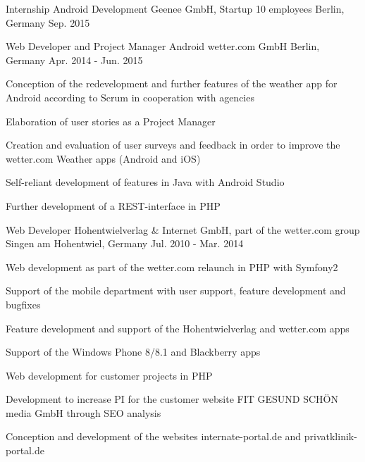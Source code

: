 \begin{cventries}
  \cventry
    {Internship Android Development} %
    {Geenee GmbH, Startup 10 employees} %
    {Berlin, Germany} %
    {Sep. 2015} %

  \cventry
    {Web Developer and Project Manager Android} %
    {wetter.com GmbH} %
    {Berlin, Germany} %
    {Apr. 2014 - Jun. 2015} %
    {
      \begin{cvitems} %
        \item {Conception of the redevelopment and further features of the weather app for Android according to Scrum in cooperation with agencies}
        \item {Elaboration of user stories as a Project Manager}
        \item {Creation and evaluation of user surveys and feedback in order to improve the wetter.com Weather apps (Android and iOS)}
        \item {Self-reliant development of features in Java with Android Studio}
        \item {Further development of a REST-interface in PHP}
      \end{cvitems}
    }

  \cventry
    {Web Developer} %
    {Hohentwielverlag \& Internet GmbH, part of the wetter.com group} %
    {Singen am Hohentwiel, Germany} %
    {Jul. 2010 - Mar. 2014} %
    {
      \begin{cvitems} %
        \item {Web development as part of the wetter.com relaunch in PHP with Symfony2}
        \item {Support of the mobile department with user support, feature development and bugfixes}
        \item {Feature development and support of the Hohentwielverlag and wetter.com apps}
        \item {Support of the Windows Phone 8/8.1 and Blackberry apps}
        \item {Web development for customer projects in PHP}
        \item {Development to increase PI for the customer website FIT GESUND SCHÖN media GmbH through SEO analysis}
        \item {Conception and development of the websites internate-portal.de and privatklinik-portal.de}
      \end{cvitems}
    }
    

\end{cventries}
